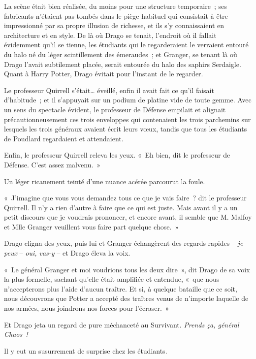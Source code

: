 \later

La scène était bien réalisée, du moins pour une structure temporaire~; ses fabricants n'étaient pas tombés dans le piège habituel qui consistait à être impressionné par sa propre illusion de richesse, et ils s'y connaissaient en architecture et en style. De là où Drago se tenait, l'endroit où il fallait évidemment qu'il se tienne, les étudiants qui le regarderaient le verraient entouré du halo né du léger scintillement des émeraudes~; et Granger, se tenant là où Drago l'avait subtilement placée, serait entourée du halo des saphirs Serdaigle. Quant à Harry Potter, Drago évitait pour l'instant de le regarder.

Le professeur Quirrell s'était… éveillé, enfin il avait fait ce qu'il faisait d'habitude~; et il s'appuyait sur un podium de platine vide de toute gemme. Avec un sens du spectacle évident, le professeur de Défense empilait et alignait précautionneusement ces trois enveloppes qui contenaient les trois parchemins sur lesquels les trois généraux avaient écrit leurs vœux, tandis que tous les étudiants de Poudlard regardaient et attendaient.

Enfin, le professeur Quirrell releva les yeux. «~Eh bien, dit le professeur de Défense. C'est assez malvenu.~»

Un léger ricanement teinté d'une nuance acérée parcourut la foule.

«~J'imagine que vous vous demandez tous ce que je vais faire~? dit le professeur Quirrell. Il n'y a rien d'autre à faire que ce qui est juste. Mais avant il y a un petit discours que je voudrais prononcer, et encore avant, il semble que M. Malfoy et Mlle Granger veuillent vous faire part quelque chose.~»

Drago cligna des yeux, puis lui et Granger échangèrent des regards rapides -- \emph{je peux} -- \emph{oui, vas-y} -- et Drago éleva la voix.

«~Le général Granger et moi voudrions tous les deux dire~», dit Drago de sa voix la plus formelle, sachant qu'elle était amplifiée et entendue, «~que nous n'accepterons plus l'aide d'aucun traître. Et si, à quelque bataille que ce soit, nous découvrons que Potter a accepté des traîtres venus de n'importe laquelle de nos armées, nous joindrons nos forces pour l'écraser.~»

Et Drago jeta un regard de pure méchanceté au Survivant. \emph{Prends ça, général Chaos~!}

Il y eut un susurrement de surprise chez les étudiants.

